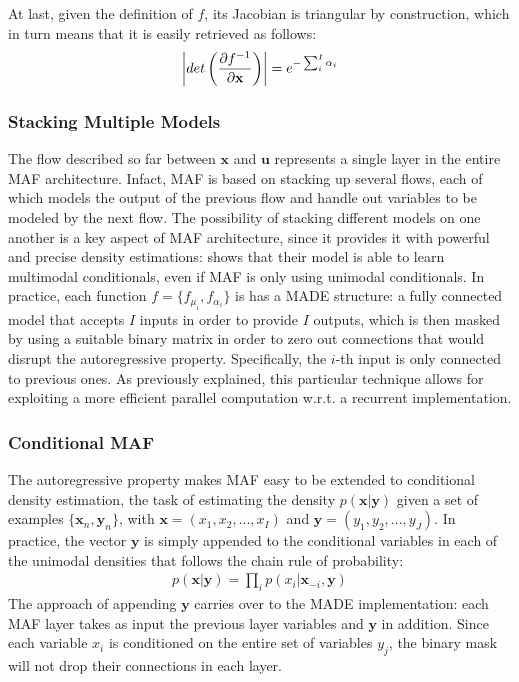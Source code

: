             \\\\
            At last, given the definition of $f$, its Jacobian is triangular by construction, which in turn means that it is easily retrieved as follows:
            \begin{align}
                \abs*{ det \left( \frac{\partial f^{-1}}{\partial \mathbf{x}} \right) } = e^{-\sum_{i}^{I} \alpha_i}
            \end{align}
            
            \subsubsection{Stacking Multiple Models}
                The flow described so far between $\mathbf{x}$ and $\mathbf{u}$ represents a single layer in the entire MAF architecture. Infact, MAF is based on stacking up several flows, each of which models the output of the previous flow and handle out variables to be modeled by the next flow. The possibility of stacking different models on one another is a key aspect of MAF architecture, since it provides it with powerful and precise density estimations:  shows that their model is able to learn multimodal conditionals, even if MAF is only using unimodal conditionals. \newline
                In practice, each function $f = \{ f_{\mu_i}, f_{\alpha_i} \}$ is has a MADE structure: a fully connected model that accepts $I$ inputs in order to provide $I$ outputs, which is then masked by using a suitable binary matrix in order to zero out connections that would disrupt the autoregressive property. Specifically, the $i$-th input is only connected to previous ones. As previously explained, this particular technique allows for exploiting a more efficient parallel computation w.r.t. a recurrent implementation.
                
            \subsubsection{Conditional MAF}
                The autoregressive property makes MAF easy to be extended to conditional density estimation, the task of estimating the density $p(\mathbf{x}\vert\mathbf{y})$ given a set of examples $\{ \mathbf{x}_n, \mathbf{y}_n\}$, with $\mathbf{x} = (x_1, x_2, ..., x_I)$ and $\mathbf{y} = (y_1, y_2, ..., y_J)$. In practice, the vector $\mathbf{y}$ is simply appended to the conditional variables in each of the unimodal densities that follows the chain rule of probability:
                \begin{align}
                    p(\mathbf{x}\vert\mathbf{y}) = \prod_{i} p(x_i \vert \mathbf{x}_{-i}, \mathbf{y})
                \end{align}
                The approach of appending $\mathbf{y}$ carries over to the MADE implementation: each MAF layer takes as input the previous layer variables and $\mathbf{y}$ in addition. Since each variable $x_i$ is conditioned on the entire set of variables $y_j$, the binary mask will not drop their connections in each layer.
    
    